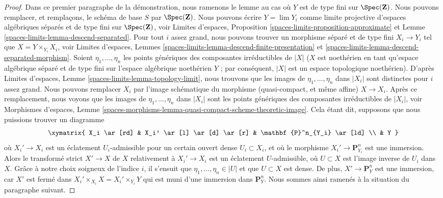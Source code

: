 \begin{proof}
Dans ce premier paragraphe de la démonstration, nous ramenons le lemme au cas
où $Y$ est de type fini sur $\Spec(\mathbf{Z})$.
Nous pouvons remplacer, et remplaçons, le schéma de base $S$ par $\Spec(\mathbf{Z})$.
Nous pouvons écrire $Y = \lim Y_i$ comme limite projective d'espaces algébriques
séparés et de type fini sur $\Spec(\mathbf{Z})$, voir
Limites d'espaces, Proposition \ref{spaces-limits-proposition-approximate} et
Lemme \ref{spaces-limits-lemma-descend-separated}.
Pour tout $i$ assez grand, nous pouvons trouver un morphisme séparé et de type fini
$X_i \to Y_i$ tel que $X = Y \times_{Y_i} X_i$, voir
Limites d'espaces, Lemmes
\ref{spaces-limits-lemma-descend-finite-presentation} et
\ref{spaces-limits-lemma-descend-separated-morphism}.
Soient $\eta_1, \ldots, \eta_n$ les points génériques des composantes
irréductibles de $|X|$ ($X$ est noethérien en tant qu'espace algébrique séparé
et de type fini sur l'espace algébrique noethérien $Y$ ; par conséquent,
$|X|$ est un espace topologique noethérien).
D'après Limites d'espaces, Lemme \ref{spaces-limits-lemma-topology-limit},
nous trouvons que les images de $\eta_1, \ldots, \eta_n$ dans $|X_i|$
sont distinctes pour $i$ assez grand. Nous pouvons remplacer
$X_i$ par l'image schématique du morphisme (quasi-compact, et même affine)
$X \to X_i$.
Après ce remplacement, nous voyons que les images
de $\eta_1, \ldots, \eta_n$ dans $|X_i|$ sont les points génériques des
composantes irréductibles de $|X_i|$, voir
Morphismes d'espaces, Lemme
\ref{spaces-morphisms-lemma-quasi-compact-scheme-theoretic-image}.
Cela étant dit, supposons que nous puissions trouver un diagramme
$$
\xymatrix{
X_i \ar[rd] & X_i' \ar[l] \ar[d] \ar[r] & \mathbf{P}^n_{Y_i} \ar[ld] \\
& Y
}
$$
où $X_i' \to X_i$ est un éclatement $U_i$-admissible pour un certain ouvert dense
$U_i \subset X_i$, et où le morphisme $X_i' \to \mathbf{P}^n_{Y_i}$
est une immersion. Alors le transformé strict $X' \to X$ de $X$ relativement
à $X_i' \to X_i$ est un éclatement $U$-admissible, où $U \subset X$
est l'image inverse de $U_i$ dans $X$. Grâce à notre choix soigneux de
l'indice $i$, il s'ensuit que $\eta_1, \ldots, \eta_n \in |U|$ et que
$U \subset X$ est dense. De plus, $X' \to \mathbf{P}^n_Y$ est une
immersion, car $X'$ est fermé dans
$X_i' \times_{X_i} X = X_i' \times_{Y_i} Y$
qui est muni d'une immersion dans $\mathbf{P}^n_Y$. Nous sommes ainsi ramenés
à la situation du paragraphe suivant.


\end{proof}

